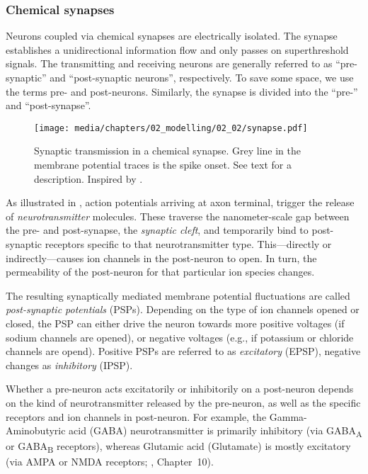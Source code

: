 \subsubsection{Chemical synapses}
Neurons coupled via chemical synapses are electrically isolated.
The synapse establishes a unidirectional information flow and only passes on superthreshold signals.
The transmitting and receiving neurons are generally referred to as \enquote{pre-synaptic} and \enquote{post-synaptic neurons}, respectively.
To save some space, we use the terms pre- and post-neurons.
Similarly, the synapse is divided into the \enquote{pre-} and \enquote{post-synapse}.

\begin{figure}
	\texttt{[image: media/chapters/02\_modelling/02\_02/synapse.pdf]}%
	\caption[Synaptic transmission in a chemical synapse]{Synaptic transmission in a chemical synapse. Grey line in the membrane potential traces is the spike onset. See text for a description. Inspired by \citet[Figure~8-8B-C, p.~185]{kandel2012principles}.}
	\label{fig:synapse}
\end{figure}

As illustrated in , action potentials arriving at axon terminal, trigger the release of \emph{neurotransmitter} molecules.
These traverse the nanometer-scale gap between the pre- and post-synapse, the \emph{synaptic cleft}, and temporarily bind to post-synaptic receptors specific to that neurotransmitter type.
This---directly or indirectly---causes ion channels in the post-neuron to open.
In turn, the permeability of the post-neuron for that particular ion species changes.

The resulting synaptically mediated membrane potential fluctuations are called \emph{post-synaptic potentials} (PSPs).
Depending on the type of ion channels opened or closed, the PSP can either drive the neuron towards more positive voltages (if sodium channels are opened), or negative voltages (e.g., if potassium or chloride channels are opend).
Positive PSPs are referred to as \emph{excitatory} (EPSP), negative changes as \emph{inhibitory} (IPSP).

Whether a pre-neuron acts excitatorily or inhibitorily on a post-neuron depends on the kind of neurotransmitter released by the pre-neuron, as well as the specific receptors and ion channels in post-neuron.
For example, the Gamma-Aminobutyric acid (GABA) neurotransmitter is primarily inhibitory (via GABA\textsubscript{A} or GABA\textsubscript{B} receptors), whereas Glutamic acid (Glutamate) is mostly excitatory (via AMPA or NMDA receptors; \cite{kandel2012principles}, Chapter~10).

